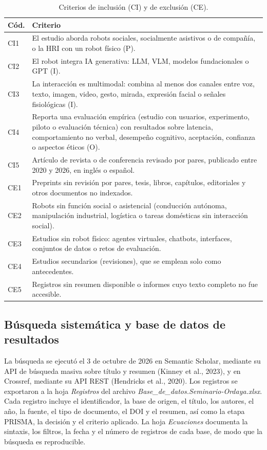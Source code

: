 \documentclass[runningheads]{llncs}
\begin{document}
\begin{table}[htbp]
\centering
\caption{Criterios de inclusión (CI) y de exclusión (CE).}
\label{tab:criterios}
\footnotesize
\begin{tabular}{L{0.9cm}L{10.4cm}}
\toprule
\textbf{Cód.} & \textbf{Criterio} \\
\midrule
CI1 & El estudio aborda robots sociales, socialmente asistivos o de compañía, o la HRI con un robot físico (P). \\
CI2 & El robot integra IA generativa: LLM, VLM, modelos fundacionales o GPT (I). \\
CI3 & La interacción es multimodal: combina al menos dos canales entre voz, texto, imagen, video, gesto, mirada, expresión facial o señales fisiológicas (I). \\
CI4 & Reporta una evaluación empírica (estudio con usuarios, experimento, piloto o evaluación técnica) con resultados sobre latencia, comportamiento no verbal, desempeño cognitivo, aceptación, confianza o aspectos éticos (O). \\
CI5 & Artículo de revista o de conferencia revisado por pares, publicado entre 2020 y 2026, en inglés o español. \\
\midrule
CE1 & Preprints sin revisión por pares, tesis, libros, capítulos, editoriales y otros documentos no indexados. \\
CE2 & Robots sin función social o asistencial (conducción autónoma, manipulación industrial, logística o tareas domésticas sin interacción social). \\
CE3 & Estudios sin robot físico: agentes virtuales, chatbots, interfaces, conjuntos de datos o retos de evaluación. \\
CE4 & Estudios secundarios (revisiones), que se emplean solo como antecedentes. \\
CE5 & Registros sin resumen disponible o informes cuyo texto completo no fue accesible. \\
\bottomrule
\end{tabular}
\end{table}

\subsection{Búsqueda sistemática y base de datos de resultados}
La búsqueda se ejecutó el 3 de octubre de 2026 en Semantic Scholar, mediante su API de búsqueda masiva sobre título y resumen (Kinney et al., 2023), y en Crossref, mediante su API REST (Hendricks et al., 2020). Los registros se exportaron a la hoja \textit{Registros} del archivo \textit{Base\_de\_datos.Seminario-Ordaya.xlsx}. Cada registro incluye el identificador, la base de origen, el título, los autores, el año, la fuente, el tipo de documento, el DOI y el resumen, así como la etapa PRISMA, la decisión y el criterio aplicado. La hoja \textit{Ecuaciones} documenta la sintaxis, los filtros, la fecha y el número de registros de cada base, de modo que la búsqueda es reproducible.
\end{document}

